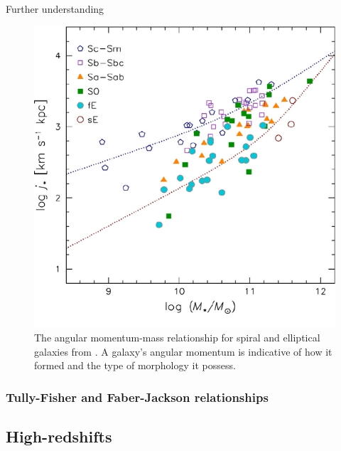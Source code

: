 \documentclass[12pt, twocolumn]{revtex4-1}    %
\begin{document}
Further understanding 
\begin{figure}
\includegraphics[width=1.0\linewidth]{introduction/romanowsky_2012_fig_3}
\captionsetup{justification=raggedright}
\caption{The angular momentum-mass relationship for spiral and elliptical galaxies from \cite{2012ApJS..203...17R}. A galaxy's angular momentum is indicative of how it formed and the type of morphology it possess.}
\label{fig:romanowsky_fall_2012}
\end{figure}


\vspace{4ex}
\subsubsection{Tully-Fisher and Faber-Jackson relationships}


\subsection{High-redshifts}
\end{document}
